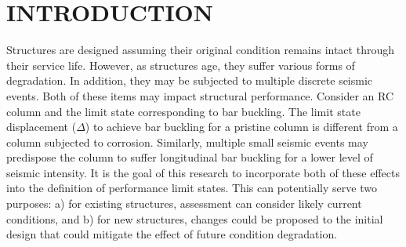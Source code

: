 \chapter{INTRODUCTION}
\label{chap-one}

Structures are designed assuming their original condition remains intact through their service life. However, as structures age, they suffer various forms of degradation. In addition, they may be subjected to multiple discrete seismic events. Both of these items may impact  structural performance. Consider an RC column and the limit state corresponding to bar buckling. The limit state displacement ($\Delta$) to achieve bar buckling for a pristine column is different from a column subjected to corrosion. Similarly, multiple small seismic events may predispose the column to suffer longitudinal bar buckling for a lower level of seismic intensity. It is the goal of this research to incorporate both of these effects into the definition of performance limit states. This can potentially serve two purposes: a) for existing structures, assessment can consider likely current conditions, and b) for new structures, changes could be proposed to the initial design that could mitigate the effect of future condition degradation.


